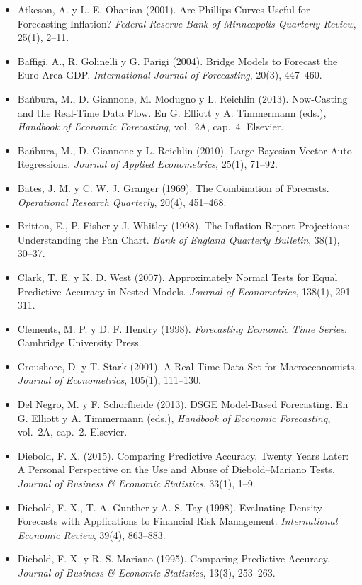 \documentclass[11pt,a4paper]{article}
\begin{document}
{\small
\begin{itemize}[leftmargin=1.4em,itemsep=1pt,label={}]
\item Atkeson, A. y L. E. Ohanian (2001). Are Phillips Curves Useful for Forecasting Inflation? \emph{Federal Reserve Bank of Minneapolis Quarterly Review}, 25(1), 2--11.
\item Baffigi, A., R. Golinelli y G. Parigi (2004). Bridge Models to Forecast the Euro Area GDP. \emph{International Journal of Forecasting}, 20(3), 447--460.
\item Bańbura, M., D. Giannone, M. Modugno y L. Reichlin (2013). Now-Casting and the Real-Time Data Flow. En G. Elliott y A. Timmermann (eds.), \emph{Handbook of Economic Forecasting}, vol.~2A, cap.~4. Elsevier.
\item Bańbura, M., D. Giannone y L. Reichlin (2010). Large Bayesian Vector Auto Regressions. \emph{Journal of Applied Econometrics}, 25(1), 71--92.
\item Bates, J. M. y C. W. J. Granger (1969). The Combination of Forecasts. \emph{Operational Research Quarterly}, 20(4), 451--468.
\item Britton, E., P. Fisher y J. Whitley (1998). The Inflation Report Projections: Understanding the Fan Chart. \emph{Bank of England Quarterly Bulletin}, 38(1), 30--37.
\item Clark, T. E. y K. D. West (2007). Approximately Normal Tests for Equal Predictive Accuracy in Nested Models. \emph{Journal of Econometrics}, 138(1), 291--311.
\item Clements, M. P. y D. F. Hendry (1998). \emph{Forecasting Economic Time Series}. Cambridge University Press.
\item Croushore, D. y T. Stark (2001). A Real-Time Data Set for Macroeconomists. \emph{Journal of Econometrics}, 105(1), 111--130.
\item Del Negro, M. y F. Schorfheide (2013). DSGE Model-Based Forecasting. En G. Elliott y A. Timmermann (eds.), \emph{Handbook of Economic Forecasting}, vol.~2A, cap.~2. Elsevier.
\item Diebold, F. X. (2015). Comparing Predictive Accuracy, Twenty Years Later: A Personal Perspective on the Use and Abuse of Diebold--Mariano Tests. \emph{Journal of Business \& Economic Statistics}, 33(1), 1--9.
\item Diebold, F. X., T. A. Gunther y A. S. Tay (1998). Evaluating Density Forecasts with Applications to Financial Risk Management. \emph{International Economic Review}, 39(4), 863--883.
\item Diebold, F. X. y R. S. Mariano (1995). Comparing Predictive Accuracy. \emph{Journal of Business \& Economic Statistics}, 13(3), 253--263.

\end{itemize}}
\end{document}
